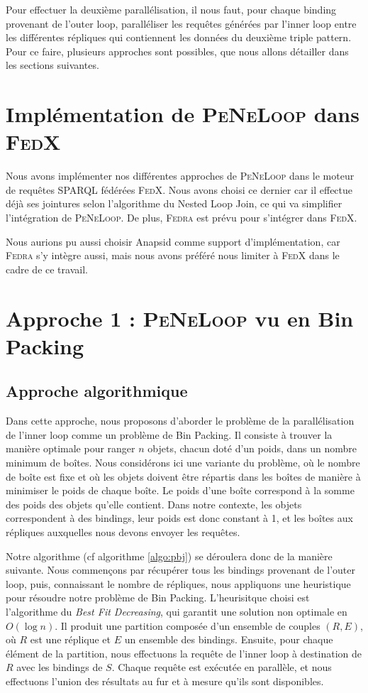 \documentclass[a4paper]{article}
\def\fedra{\textsc{Fedra}\xspace}
\def\fedx{\textsc{FedX}\xspace}
\def\peneloop{\textsc{PeNeLoop}\xspace}
\begin{document}
Pour effectuer la deuxième parallélisation, il nous faut, pour chaque binding provenant de l'outer loop, paralléliser les requêtes générées par l'inner loop entre les différentes répliques qui contiennent les données du deuxième triple pattern. Pour ce faire, plusieurs approches sont possibles, que nous allons détailler dans les sections suivantes.

\section{Implémentation de \peneloop dans \fedx}

Nous avons implémenter nos différentes approches de \peneloop dans le moteur de requêtes SPARQL fédérées \fedx. Nous avons choisi ce dernier car il effectue déjà ses jointures selon l'algorithme du Nested Loop Join, ce qui va simplifier l'intégration de \peneloop. De plus, \fedra est prévu pour s'intégrer dans \fedx.

Nous aurions pu aussi choisir Anapsid \cite{acosta2011anapsid} comme support d'implémentation, car \fedra s'y intègre aussi, mais nous avons préféré nous limiter à \fedx dans le cadre de ce travail.

\section{Approche 1 : \peneloop vu en Bin Packing}

\subsection{Approche algorithmique}

Dans cette approche, nous proposons d'aborder le problème de la parallélisation de l'inner loop comme un problème de Bin Packing. Il consiste à trouver la manière optimale pour ranger $n$ objets, chacun doté d'un poids, dans un nombre minimum de boîtes. Nous considérons ici une variante du problème, où le nombre de boîte est fixe et où les objets doivent être répartis dans les boîtes de manière à minimiser le poids de chaque boîte. Le poids d'une boîte correspond à la somme des poids des objets qu'elle contient. Dans notre contexte, les objets correspondent à des bindings, leur poids est donc constant à 1, et les boîtes aux répliques auxquelles nous devons envoyer les requêtes.

Notre algorithme (cf algorithme \ref{algo:pbj}) se déroulera donc de la manière suivante. Nous commençons par récupérer tous les bindings provenant de l'outer loop, puis, connaissant le nombre de répliques, nous appliquons une heuristique pour résoudre notre problème de Bin Packing. L'heurisitque choisi est l'algorithme du \textit{Best Fit Decreasing}, qui garantit une solution non optimale en $O(\log n)$. Il produit une partition composée d'un ensemble de couples $(R, E)$, où $R$ est une réplique et $E$ un ensemble des bindings. Ensuite, pour chaque élément de la partition, nous effectuons la requête de l'inner loop à destination de $R$ avec les bindings de $S$. Chaque requête est exécutée en parallèle, et nous effectuons l'union des résultats au fur et à mesure qu'ils sont disponibles.
\end{document}
